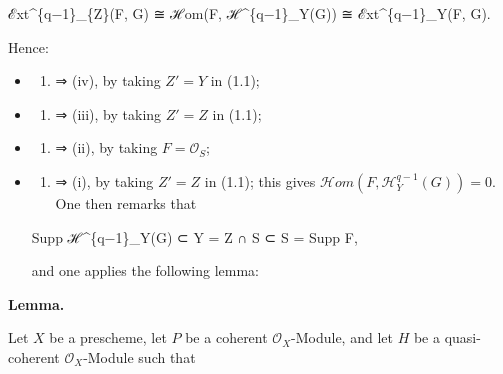 \documentclass[
]{article}
\newenvironment{Shaded}{}{}
\newcommand{\NormalTok}[1]{#1}
\providecommand{\tightlist}{%
  \setlength{\itemsep}{0pt}\setlength{\parskip}{0pt}}
\begin{document}
\begin{Shaded}
\begin{Highlighting}[]
\NormalTok{ℰxt\^{}\{q−1\}\_\{Z\textquotesingle{}\}(F, G) ≅ ℋom(F, ℋ\^{}\{q−1\}\_Y(G)) ≅ ℰxt\^{}\{q−1\}\_Y(F, G).}
\end{Highlighting}
\end{Shaded}

Hence:

\begin{itemize}
\item
  \begin{enumerate}
  \def\labelenumi{(\roman{enumi})}
  \tightlist
  \item
    ⇒ (iv), by taking \(Z' = Y\) in (1.1);
  \end{enumerate}
\item
  \begin{enumerate}
  \def\labelenumi{(\roman{enumi})}
  \setcounter{enumi}{3}
  \tightlist
  \item
    ⇒ (iii), by taking \(Z' = Z\) in (1.1);
  \end{enumerate}
\item
  \begin{enumerate}
  \def\labelenumi{(\roman{enumi})}
  \setcounter{enumi}{2}
  \tightlist
  \item
    ⇒ (ii), by taking \(F = \mathcal{O}_{S}\);
  \end{enumerate}
\item
  \begin{enumerate}
  \def\labelenumi{(\roman{enumi})}
  \setcounter{enumi}{1}
  \tightlist
  \item
    ⇒ (i), by taking \(Z' = Z\) in (1.1); this gives
    \(\mathcal{H}om(F, \mathcal{H}^{q-1}_{Y}(G)) = 0\). One then remarks
    that
  \end{enumerate}

\begin{Shaded}
\begin{Highlighting}[]
\NormalTok{Supp ℋ\^{}\{q−1\}\_Y(G) ⊂ Y = Z ∩ S ⊂ S = Supp F,}
\end{Highlighting}
\end{Shaded}

  and one applies the following lemma:
\end{itemize}

\textbf{Lemma.}

Let \(X\) be a prescheme, let \(P\) be a coherent
\(\mathcal{O}_{X}\)-Module, and let \(H\) be a quasi-coherent
\(\mathcal{O}_{X}\)-Module such that
\end{document}
